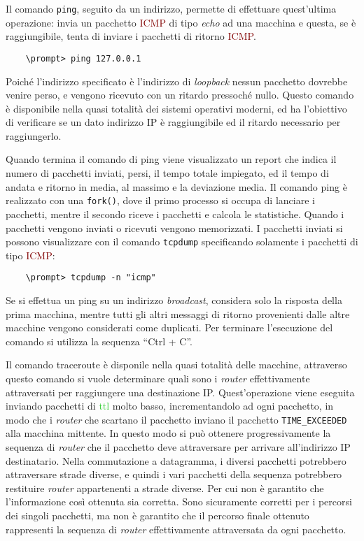 \documentclass{article}
\numberwithin{equation}{subsection}
\begin{document}
Il comando \verb|ping|, seguito da un indirizzo, permette di effettuare quest'ultima operazione: invia un pacchetto \textcolor{Maroon}{ICMP} di tipo \textit{echo} ad una macchina e questa, se è raggiungibile, tenta di 
inviare i pacchetti di ritorno \textcolor{Maroon}{ICMP}. 
\begin{verbatim}
    \prompt> ping 127.0.0.1
\end{verbatim}
Poiché l'indirizzo specificato è l'indirizzo di \textit{loopback} nessun pacchetto dovrebbe venire perso, e vengono ricevuto con un ritardo pressoché nullo. 
Questo comando è disponibile nella quasi totalità dei sistemi operativi moderni, ed ha l'obiettivo di verificare se un dato indirizzo \textcolor{Bittersweet}{IP} è 
raggiungibile ed il ritardo necessario per raggiungerlo. 

Quando termina il comando di ping viene visualizzato un report che indica il numero di pacchetti inviati, persi, il tempo totale impiegato, ed il tempo di andata e 
ritorno in media, al massimo e la deviazione media. 
Il comando ping è realizzato con una \verb|fork()|, dove il primo processo si occupa di lanciare i pacchetti, mentre il secondo riceve i pacchetti e calcola le statistiche. Quando i pacchetti vengono 
inviati o ricevuti vengono memorizzati. I pacchetti inviati si possono visualizzare con il comando \verb|tcpdump| specificando solamente i pacchetti di tipo \textcolor{Maroon}{ICMP}:
\begin{verbatim}
    \prompt> tcpdump -n "icmp"
\end{verbatim}

Se si effettua un ping su un indirizzo \textit{broadcast}, considera solo la risposta della prima macchina, mentre tutti gli altri messaggi di ritorno provenienti dalle 
altre macchine vengono considerati come duplicati. Per terminare l'esecuzione del comando si utilizza la sequenza ``Ctrl + C''. 


Il comando traceroute è disponile nella quasi totalità delle macchine, attraverso questo comando si vuole determinare quali sono i \textit{router} effettivamente attraversati 
per raggiungere una destinazione \textcolor{Bittersweet}{IP}. 
Quest'operazione viene eseguita inviando pacchetti di \textcolor{LimeGreen}{ttl} molto basso, incrementandolo ad ogni pacchetto, in modo che i \textit{router} che scartano il pacchetto inviano 
il pacchetto \verb|TIME_EXCEEDED| alla macchina mittente. In questo modo si può ottenere progressivamente la sequenza di \textit{router} che il pacchetto deve 
attraversare per arrivare all'indirizzo \textcolor{Bittersweet}{IP} destinatario. 
Nella commutazione a datagramma, i diversi pacchetti potrebbero attraversare strade diverse, e quindi i vari pacchetti della sequenza potrebbero restituire \textit{router} appartenenti a strade diverse. Per cui non è garantito che l'informazione così ottenuta sia corretta. Sono sicuramente corretti per i percorsi dei singoli pacchetti, ma non è garantito che il percorso finale ottenuto rappresenti la sequenza di \textit{router} effettivamente attraversata da ogni pacchetto. 
\end{document}
